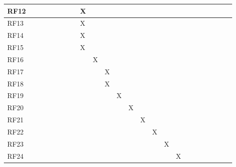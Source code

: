 \begin{table}[htb]
\begin{tabular}{|l|l|l|l|l|l|l|l|l|l|l|l|l|l|l|l|l|l|l|l|l|l|l|l|}
RF12&      &      &      &      &      &      &      &   X   &      &      &      &      &      &      &      &      &      &      &      &      &      &      &      \\ \hline
RF13&      &      &      &      &      &      &      &   X   &      &      &      &      &      &      &      &      &      &      &      &      &      &      &      \\ \hline
RF14&      &      &      &      &      &      &      &   X   &      &      &      &      &      &      &      &      &      &      &      &      &      &      &      \\ \hline
RF15&      &      &      &      &      &      &      &   X   &      &      &      &      &      &      &      &      &      &      &      &      &      &      &      \\ \hline
RF16&      &      &      &      &      &      &      &      &   X   &      &      &      &      &      &      &      &      &      &      &      &      &      &      \\ \hline
RF17&      &      &      &      &      &      &      &      &      &   X   &      &      &      &      &      &      &      &      &      &      &      &      &      \\ \hline
RF18&      &      &      &      &      &      &      &      &      &   X   &      &      &      &      &      &      &      &      &      &      &      &      &      \\ \hline
RF19&      &      &      &      &      &      &      &      &      &      &    X  &      &      &      &      &      &      &      &      &      &      &      &      \\ \hline
RF20&      &      &      &      &      &      &      &      &      &      &      &   X   &      &      &      &      &      &      &      &      &      &      &      \\ \hline
RF21&      &      &      &      &      &      &      &      &      &      &      &      &   X   &      &      &      &      &      &      &      &      &      &      \\ \hline
RF22&      &      &      &      &      &      &      &      &      &      &      &      &      &   X   &      &      &      &      &      &      &      &      &      \\ \hline
RF23&      &      &      &      &      &      &      &      &      &      &      &      &      &      &   X   &      &      &      &      &      &      &      &      \\ \hline
RF24&      &      &      &      &      &      &      &      &      &      &      &      &      &      &      &   X   &      &      &      &      &      &      &      \\ \hline

\end{tabular}
\end{table}
